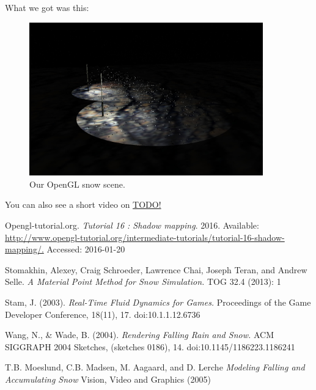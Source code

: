 \documentclass[a4paper,12pt]{article}
\begin{document}
What we got was this:

\begin{figure}[ht]
  \centering
  \includegraphics[width=0.9\textwidth]{result}
  \caption{\label{fig:label} Our OpenGL snow scene.}
\end{figure}

You can also see a short video on \href{YouTube}{TODO!}

\newpage

\begin{thebibliography}{9}
    Opengl-tutorial.org.
    \emph{Tutorial 16 : Shadow mapping}.
    2016.
    Available: \url{http://www.opengl-tutorial.org/intermediate-tutorials/tutorial-16-shadow-mapping/.}
    Accessed: 2016-01-20

    Stomakhin, Alexey, Craig Schroeder, Lawrence Chai, Joseph Teran, and Andrew Selle.
    \emph{A Material Point Method for Snow Simulation.}
    TOG 32.4 (2013): 1

    Stam, J. (2003).
    \emph{Real-Time Fluid Dynamics for Games.}
    Proceedings of the Game Developer Conference, 18(11), 17. doi:10.1.1.12.6736

    Wang, N., \& Wade, B. (2004).
    \emph{Rendering Falling Rain and Snow.}
    ACM SIGGRAPH 2004 Sketches, (sketches 0186), 14. doi:10.1145/1186223.1186241

    T.B. Moeslund, C.B. Madsen, M. Aagaard, and D. Lerche
    \emph{Modeling Falling and Accumulating Snow}
    Vision, Video and Graphics (2005)


\end{thebibliography}
\end{document}
